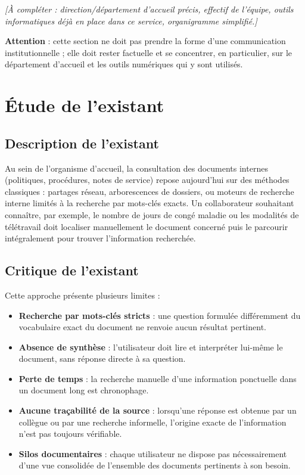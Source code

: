 \documentclass[12pt,a4paper]{report}
\newcommand{\note}[1]{\textit{[#1]}}
\begin{document}
\note{À compléter : direction/département d'accueil précis, effectif de l'équipe, outils informatiques déjà en place dans ce service, organigramme simplifié.}

\textbf{Attention} : cette section ne doit pas prendre la forme d'une communication institutionnelle ; elle doit rester factuelle et se concentrer, en particulier, sur le département d'accueil et les outils numériques qui y sont utilisés.

\section{Étude de l'existant}

\subsection{Description de l'existant}
Au sein de l'organisme d'accueil, la consultation des documents internes (politiques, procédures, notes de service) repose aujourd'hui sur des méthodes classiques : partages réseau, arborescences de dossiers, ou moteurs de recherche interne limités à la recherche par mots-clés exacts. Un collaborateur souhaitant connaître, par exemple, le nombre de jours de congé maladie ou les modalités de télétravail doit localiser manuellement le document concerné puis le parcourir intégralement pour trouver l'information recherchée.

\subsection{Critique de l'existant}
Cette approche présente plusieurs limites :
\begin{itemize}
  \item \textbf{Recherche par mots-clés stricts} : une question formulée différemment du vocabulaire exact du document ne renvoie aucun résultat pertinent.
  \item \textbf{Absence de synthèse} : l'utilisateur doit lire et interpréter lui-même le document, sans réponse directe à sa question.
  \item \textbf{Perte de temps} : la recherche manuelle d'une information ponctuelle dans un document long est chronophage.
  \item \textbf{Aucune traçabilité de la source} : lorsqu'une réponse est obtenue par un collègue ou par une recherche informelle, l'origine exacte de l'information n'est pas toujours vérifiable.
  \item \textbf{Silos documentaires} : chaque utilisateur ne dispose pas nécessairement d'une vue consolidée de l'ensemble des documents pertinents à son besoin.
\end{itemize}
\end{document}

